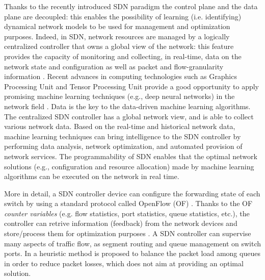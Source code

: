 Thanks to the recently introduced SDN paradigm \cite{Sezer2013,Kreutz2015, Jarschel2014, Chen2015, Ameigeiras2015} the control plane and the data plane are decoupled: this enables the possibility of learning (i.e. identifying) dynamical network models to be used for management and optimization purposes. Indeed, in SDN, network resources are managed by a logically centralized controller that owns a global view of the network: this feature provides the capacity of monitoring and collecting, in real-time, data on the network state and configuration as well as packet and flow-granularity information \cite{Amaral2016}. Recent advances in computing technologies such as Graphics Processing Unit and Tensor Processing Unit provide a good opportunity to apply promising machine learning techniques (e.g., deep neural networks) in the network field \cite{Wang2018, Usama2017}. Data is the key to the data-driven machine learning algorithms. The centralized SDN controller has a global network view, and is able to collect various network data. Based on the real-time and historical network data, machine learning techniques can bring intelligence to the SDN controller by performing data analysis, network optimization, and automated provision of network services. The programmability of SDN enables that the optimal network solutions (e.g., configuration and resource allocation) made by machine learning algorithms can be executed on the network in real time.

More in detail, a SDN controller device can configure the forwarding state of each switch by using a standard protocol called OpenFlow (OF) \cite{McKeown2008}. Thanks to the OF \textit{counter variables} (e.g. flow statistics, port statistics, queue statistics, etc.), the controller can retrive information (feedback) from the network devices and store/process them for optimization purposes \cite{OFP13}. A SDN controller can supervise many aspects of traffic flow, as segment routing and queue management on switch ports. In \cite{Boero2016} a heuristic method is proposed to balance the packet load among queues in order to reduce packet losses, which does not aim at providing an optimal solution.

